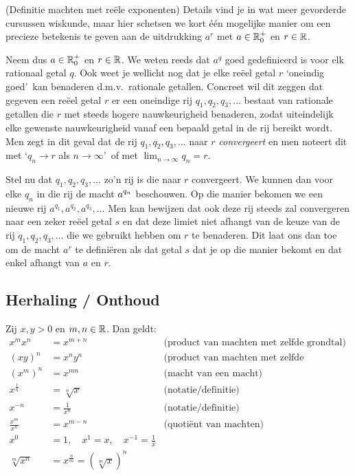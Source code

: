 \documentclass{ximera}
\begin{document}
\begin{xmuitweiding} (Definitie machten met reële exponenten)
Details vind je in wat meer gevorderde cursussen wiskunde, maar hier schetsen we kort \'{e}\'{e}n mogelijke manier om een precieze betekenis te geven
aan de uitdrukking $a^r$ met $a\in\mathbb{R}_0^+$ en $r\in\mathbb{R}$.

Neem dus $a\in\mathbb{R}_0^+$ en $r\in\mathbb{R}$. We weten reeds dat $a^q$
goed gedefinieerd is voor elk rationaal getal $q$. Ook weet je
wellicht nog dat je elke re\"eel getal $r$ \lq oneindig goed\rq\
kan benaderen d.m.v.~rationale getallen. Concreet wil dit zeggen
dat gegeven een re\"eel getal $r$ er een oneindige rij
$q_1,q_2,q_3,\ldots$ bestaat van rationale getallen die $r$ met
steeds hogere nauwkeurigheid benaderen, zodat uiteindelijk elke
gewenste nauwkeurigheid vanaf een bepaald getal in de rij bereikt
wordt. Men zegt in dit geval dat de rij $q_1,q_2,q_3,\ldots$ naar
$r$ \emph{convergeert} en men noteert dit met \lq $q_n\to r$ als
$n\to\infty$\rq\ of met $\lim_{n\to\infty}q_n=r$.

Stel nu dat $q_1,q_2,q_3,\ldots$ zo'n rij is die naar $r$
convergeert. We kunnen dan voor elke $q_n$ in die rij de macht
$\displaystyle a^{q_n}$ beschouwen. Op die manier bekomen we een nieuwe rij
$a^{q_1},a^{q_2},a^{q_3},\ldots$ 	
Men kan bewijzen dat ook deze rij steeds
zal convergeren naar een zeker re\"eel getal $s$ en dat deze
limiet niet afhangt van de keuze van de rij $q_1,q_2,q_3,\ldots$
die we gebruikt hebben  om $r$ te benaderen. Dit laat ons dan toe
om de macht $a^r$ te defini\"eren als dat getal $s$ dat je op die
manier bekomt en dat enkel afhangt van $a$ en $r$.
\end{xmuitweiding}




\subsection{Herhaling / Onthoud }\label{samenvatting:rekenregels machten}

\begin{proposition}
Zij $x,y>0$ en $m,n\in\mathbb{R}$. Dan geldt:
\begin{align*}
	x^{m}x^{n}          &= x^{m+n}     & \text{(product van machten met zelfde grondtal)}\\
	(xy)^n              &= x^ny^n      & \text{(product van machten met zelfde exponent)}\\
	\left(x^{m}\right)^{n}&= x^{mn}    & \text{(macht van een macht)}\\	
	x^{\frac1n} &= \sqrt[n] x          & \text{(notatie/definitie)}\\
	x^{-n}          &= \frac{1}{x^n}  & \text{(notatie/definitie)}\\
	\frac{x^{m}}{x^{n}} &= x^{m-n}      & \text{(quotiënt van machten)} \\
	x^0&=1, \quad x^1=x, \quad x^{-1}=\frac1x \\
	\sqrt[m]{x^n} & = x^{\frac{n}{m}} = (\sqrt[m]{x})^n
\end{align*}
\end{proposition}
\end{document}
